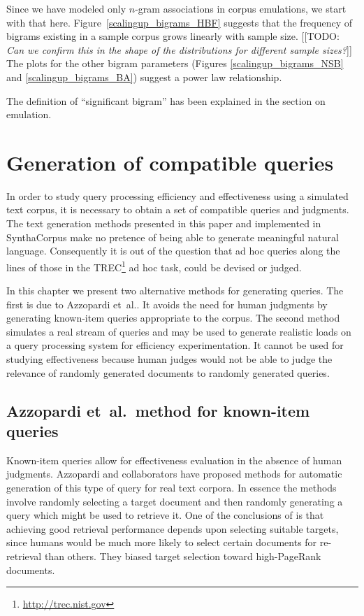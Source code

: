 \documentclass[11pt]{report}
\newcommand{\etal}{et~al.}
\newcommand{\todo}[1]{{\color{blue}[[TODO: {\emph{#1}}]]}}
\begin{document}
Since we have modeled only $n$-gram associations in corpus emulations,
we start with that here.  Figure~\ref{scalingup_bigrams_HBF} suggests that 
the frequency of bigrams existing in a sample corpus grows linearly
with sample size. \todo{Can we confirm this in the shape of the
  distributions for different sample sizes?} The plots for the other
bigram parameters (Figures \ref{scalingup_bigrams_NSB} and
\ref{scalingup_bigrams_BA})
suggest a power law relationship.

The definition of ``significant bigram'' has been explained in the
section on emulation.


\chapter{Generation of compatible queries}    %
\label{QGen}

In order to study query processing efficiency and effectiveness using
a simulated text corpus, it is necessary to obtain a set of compatible
queries and judgments.  The text generation methods presented in this
paper and implemented in SynthaCorpus make no pretence of being able
to generate meaningful natural language.  Consequently it is out of
the question that ad hoc queries along the lines of those in the
TREC\footnote{\url{http://trec.nist.gov}} ad hoc task, could be
devised or judged.

In this chapter we present two alternative methods for generating
queries.  The first is due to Azzopardi \etal. It avoids the need for
human judgments by generating known-item queries appropriate to the
corpus. The second method simulates a real stream of queries and may
be used to generate realistic loads on a query processing system for
efficiency experimentation.  It cannot be used for studying
effectiveness because human judges would not be able to judge the
relevance of randomly generated documents to randomly generated queries.

\section{Azzopardi \etal~method for known-item queries}

Known-item queries allow for effectiveness evaluation in the absence
of human judgments.  Azzopardi and collaborators
\cite{AzzopardideRijke2006, AzzopardideRijkeBalog2007} have
proposed methods for automatic generation of this type of query for
real text corpora.  In essence the methods involve randomly selecting
a target document and then randomly generating a query which might be
used to retrieve it.  One of the conclusions of
\cite{AzzopardideRijkeBalog2007}
is that achieving good retrieval performance depends upon selecting suitable
targets, since humans would be much more likely to select certain
documents for re-retrieval than others.  They biased target selection
toward high-PageRank documents.
\end{document}
